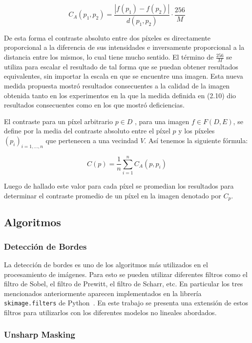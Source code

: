 \begin{equation}
	C_A(p_1,p_2)=\frac{|f(p_1)-f(p_2)|}{d(p_1,p_2)}\cdot\frac{256}{M}
\end{equation}

De esta forma el contraste absoluto entre dos p\'ixeles es directamente proporcional a la diferencia de sus intensidades e inversamente proporcional a la distancia entre los mismos, lo cual tiene mucho sentido. El t\'ermino de $\frac{256}{M}$ se utiliza para escalar el resultado de tal forma que se puedan obtener resultados equivalentes, sin importar la escala en que se encuentre una imagen. Esta nueva medida propuesta mostr\'o resultados consecuentes a la calidad de la imagen obtenida tanto en los experimentos en la que la medida definida en (2.10) dio resultados consecuentes como en los que mostr\'o deficiencias.

El contraste para un píxel arbitrario $p \in D$ , para una imagen $f \in F ( D , E )$, se define por la media del contraste absoluto entre el píxel $p$ y los píxeles $( p_i )_{i = 1,...,n}$ que pertenecen a una vecindad $V$. Así tenemos la siguiente fórmula:

\begin{equation}
	\displaystyle C(p)=\frac{1}{n}\sum_{i=1}^{n}C_A(p,p_i)
\end{equation}

Luego de hallado este valor para cada p\'ixel se promedian los resultados para determinar el contraste promedio de un p\'ixel en la imagen denotado por $C_p$.

\subsection{Algoritmos}

\subsubsection{Detecci\'on de Bordes}

La detecci\'on de bordes es uno de los algoritmos m\'as utilizados en el procesamiento de im\'agenes. Para esto se pueden utilizar diferentes filtros como el filtro de Sobel, el filtro de Prewitt, el filtro de Scharr, etc. En particular los tres mencionados anteriormente aparecen implementados en la librer\'ia \verb|skimage.filters| de Python~\cite{module_filters}. En este trabajo se presenta una extensi\'on de estos filtros para utilizarlos con los diferentes modelos no lineales abordados. 

\subsubsection{Unsharp Masking}


